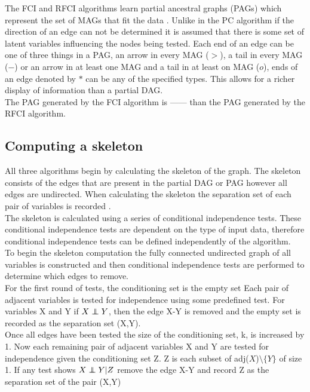 \documentclass{article}
\newcommand\independent{\protect\mathpalette{\protect\independenT}{\perp}}
\def\independenT#1#2{\mathrel{\rlap{$#1#2$}\mkern2mu{#1#2}}}
\begin{document}
The FCI and RFCI algorithms learn partial ancestral graphs (PAGs) which represent the set of MAGs that fit the data \cite{colombo2012learning}. Unlike in the PC algorithm if the direction of an edge can not be determined it is assumed that there is some set of latent variables influencing the nodes being tested. Each end of an edge can be one of three things in a PAG, an arrow in every MAG ($>$), a tail in every MAG ($-$) or an arrow in at least one MAG and a tail in at least on MAG ($o$), ends of an edge denoted by $*$ can be any of the specified types. This allows for a richer display of information than a partial DAG\cite{colombo2012learning}.
\\
The PAG generated by the FCI algorithm is 
------
than the PAG generated by the RFCI algorithm.
\\

\subsection{Computing a skeleton}
All three algorithms begin by calculating the skeleton of the graph. The skeleton consists of the edges that are present in the partial DAG or PAG however all edges are undirected. When calculating the skeleton the separation set of each pair of variables is recorded \cite{colombo2012learning, spirtes1991algorithm}.
\\

The skeleton is calculated using a series of conditional independence tests. These conditional independence tests are dependent on the type of input data, therefore conditional independence tests can be defined independently of the algorithm.
\\

To begin the skeleton computation the fully connected undirected graph of all variables is constructed and then conditional independence tests are performed to determine which edges to remove.
\\

For the first round of tests, the conditioning set is the empty set Each pair of adjacent variables is tested for independence using some predefined test. For variables X and Y if $X \independent Y$, then the edge X-Y is removed and the empty set is recorded as the separation set (X,Y).
\\

Once all edges have been tested the size of the conditioning set, k, is increased by 1. Now each remaining pair of adjacent variables X and Y are tested for independence given the conditioning set Z. Z is each subset of adj($X$)$\setminus \{Y\}$ of size 1. If any test shows $X \independent Y | Z$ remove the edge X-Y and record Z as the separation set of the pair (X,Y) 
\\
\end{document}

